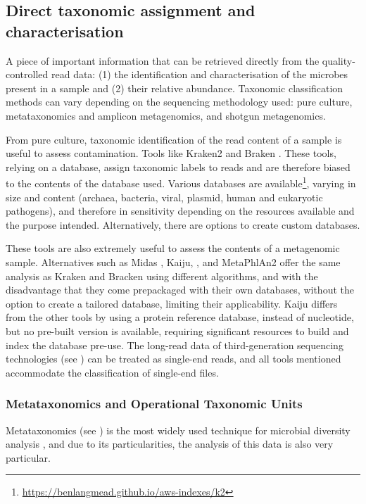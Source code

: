 \subsection{Direct taxonomic assignment and characterisation}

A piece of important information that can be retrieved directly from the quality-controlled read data: (1) the identification and characterisation of the microbes present in a sample and (2) their relative abundance. Taxonomic classification methods can vary depending on the sequencing methodology used: pure culture, metataxonomics and amplicon metagenomics, and shotgun metagenomics.

From pure culture, taxonomic identification of the read content of a sample is useful to assess contamination. Tools like Kraken2 \citep{wood_kraken_2014, wood_improved_2019} and Braken \citep{lu_bracken_2017}. These tools, relying on a database, assign taxonomic labels to reads and are therefore biased to the contents of the database used. Various databases are available\footnote{\url{https://benlangmead.github.io/aws-indexes/k2}}, varying in size and content (archaea, bacteria, viral, plasmid, human and eukaryotic pathogens), and therefore in sensitivity depending on the resources available and the purpose intended. Alternatively, there are options to create custom databases.  

These tools are also extremely useful to assess the contents of a metagenomic sample. Alternatives such as Midas \citep{nayfach_integrated_2016}, Kaiju, \citep{menzel_fast_2016}, and MetaPhlAn2 \citep{} offer the same analysis as Kraken and Bracken using different algorithms, and with the disadvantage that they come prepackaged with their own databases, without the option to create a tailored database, limiting their applicability. Kaiju differs from the other tools by using a protein reference database, instead of nucleotide, but no pre-built version is available, requiring significant resources to build and index the database pre-use. The long-read data of third-generation sequencing technologies (see ) can be treated as single-end reads, and all tools mentioned accommodate the classification of single-end files. 

\subsubsection{Metataxonomics and Operational Taxonomic Units}

Metataxonomics (see ) is the most widely used technique for microbial diversity analysis \citep{hilton_metataxonomic_2016}, and due to its particularities, the analysis of this data is also very particular. 

